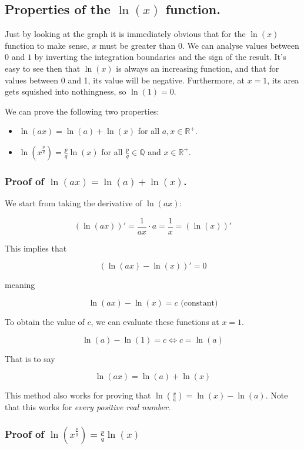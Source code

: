 \newpage

\subsection{Properties of the $\ln(x)$ function.}

Just by looking at the graph it is immediately obvious that for the $\ln(x)$ function to make sense, $x$ must be greater than $0$. We can analyse values between $0$ and $1$ by inverting the integration boundaries and the sign of the result. It's easy to see then that $\ln(x)$ is always an increasing function, and that for values between 0 and 1, its value will be negative. Furthermore, at $x = 1$, its area gets squished into nothingness, so $\ln(1) = 0$.

We can prove the following two properties:

\begin{itemize}
	\item $\ln(ax) = \ln(a) + \ln(x)$ for all $a, x \in \mathbb{R}^+$.
	\item $\ln(x^{\frac{p}{q}}) = \frac{p}{q} \ln(x)$ for all $\frac{p}{q} \in \mathbb{Q}$ and $x \in \mathbb{R}^+$.
\end{itemize}

\subsubsection{Proof of $\ln(ax) = \ln(a) + \ln(x)$.}

We start from taking the derivative of $\ln(ax)$:

$$(\ln(ax))' = \frac{1}{ax} \cdot a = \frac{1}{x} = (\ln(x))'$$

This implies that

$$(\ln(ax) - \ln(x))' = 0$$

meaning

$$\ln(ax) - \ln(x) = c \textrm{ (constant)}$$

To obtain the value of $c$, we can evaluate these functions at $x = 1$.

$$\ln(a) - \ln(1) = c \iff c = \ln(a)$$

That is to say

$$\ln(ax) = \ln(a) + \ln(x)$$

This method also works for proving that $\ln(\frac{x}{a}) = \ln(x) - \ln(a)$. Note that this works for \textit{every positive real number}. 

\subsubsection{Proof of $\ln(x^{\frac{p}{q}}) = \frac{p}{q} \ln(x)$}

